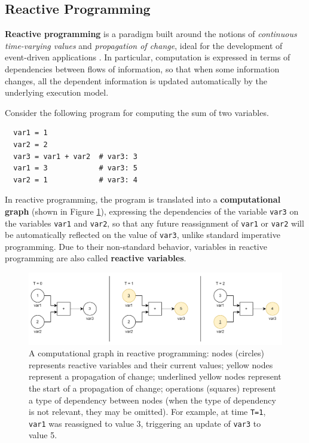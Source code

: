 \subsection{Reactive Programming}

\textbf{Reactive programming} is a paradigm built around the notions of
\textit{continuous time-varying values} and \textit{propagation of change},
ideal for the development of event-driven applications
\cite{ReactiveProgramming}. In particular, computation is expressed in terms of
dependencies between flows of information, so that when some information
changes, all the dependent information is updated automatically by the
underlying execution model.

Consider the following program for computing the sum of two variables.

\begin{lstlisting}
  var1 = 1
  var2 = 2
  var3 = var1 + var2  # var3: 3
  var1 = 3            # var3: 5
  var2 = 1            # var3: 4
\end{lstlisting}

In reactive programming, the program is translated into a \textbf{computational
graph} (shown in Figure \ref{figure:dependency-graph}), expressing the
dependencies of the variable \texttt{var3} on the variables \texttt{var1} and
\texttt{var2}, so that any future reassignment of \texttt{var1} or
\texttt{var2} will be automatically reflected on the value of \texttt{var3},
unlike standard imperative programming. Due to their non-standard behavior,
variables in reactive programming are also called \textbf{reactive variables}.

\begin{figure}[h]
  \centering
  \includegraphics[width=\textwidth]{resources/figures/dependency-graph.png}
  \caption{
    A computational graph in reactive programming: nodes (circles) represents
    reactive variables and their current values; yellow nodes represent a
    propagation of change; underlined yellow nodes represent the
    start of a propagation of change; operations (squares) represent a type
    of dependency between nodes (when the type of dependency is not relevant,
    they may be omitted). For example, at time \texttt{T=1}, \texttt{var1} was
    reassigned to value 3, triggering an update of \texttt{var3} to value 5.
  }
  \label{figure:dependency-graph}
\end{figure}

